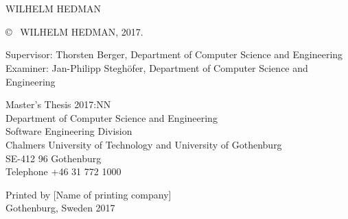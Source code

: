 \newpage
\thispagestyle{plain}
\vspace*{4.5cm}
\fullt\\
\subt\\
WILHELM HEDMAN \setlength{\parskip}{1cm}

\copyright ~ WILHELM HEDMAN, 2017. \setlength{\parskip}{1cm}

Supervisor: Thorsten Berger, Department of Computer Science and Engineering\\
Examiner: Jan-Philipp Steghöfer, Department of Computer Science and Engineering \setlength{\parskip}{1cm}

Master's Thesis 2017:NN\\	%
Department of Computer Science and Engineering\\
Software Engineering Division\\
Chalmers University of Technology and University of Gothenburg\\
SE-412 96 Gothenburg\\
Telephone +46 31 772 1000 \setlength{\parskip}{0.5cm}

\vfill


Printed by [Name of printing company]\\
Gothenburg, Sweden 2017

